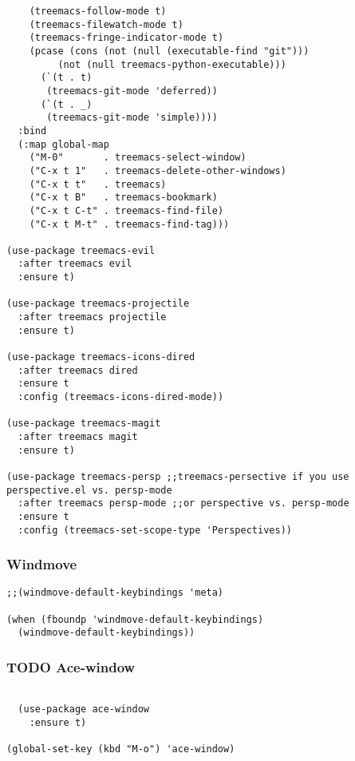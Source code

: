 \documentclass[11pt]{article}
\begin{document}
\begin{verbatim}
    (treemacs-follow-mode t)
    (treemacs-filewatch-mode t)
    (treemacs-fringe-indicator-mode t)
    (pcase (cons (not (null (executable-find "git")))
		 (not (null treemacs-python-executable)))
      (`(t . t)
       (treemacs-git-mode 'deferred))
      (`(t . _)
       (treemacs-git-mode 'simple))))
  :bind
  (:map global-map
	("M-0"       . treemacs-select-window)
	("C-x t 1"   . treemacs-delete-other-windows)
	("C-x t t"   . treemacs)
	("C-x t B"   . treemacs-bookmark)
	("C-x t C-t" . treemacs-find-file)
	("C-x t M-t" . treemacs-find-tag)))

(use-package treemacs-evil
  :after treemacs evil
  :ensure t)

(use-package treemacs-projectile
  :after treemacs projectile
  :ensure t)

(use-package treemacs-icons-dired
  :after treemacs dired
  :ensure t
  :config (treemacs-icons-dired-mode))

(use-package treemacs-magit
  :after treemacs magit
  :ensure t)

(use-package treemacs-persp ;;treemacs-persective if you use perspective.el vs. persp-mode
  :after treemacs persp-mode ;;or perspective vs. persp-mode
  :ensure t
  :config (treemacs-set-scope-type 'Perspectives))

\end{verbatim}
\subsubsection{Windmove}
\label{sec:org5c2abda}
\begin{verbatim}
;;(windmove-default-keybindings 'meta)

(when (fboundp 'windmove-default-keybindings)
  (windmove-default-keybindings))

\end{verbatim}



\subsubsection{{\bfseries\sffamily TODO} Ace-window}
\label{sec:org442b5f1}
\begin{verbatim}

  (use-package ace-window
    :ensure t)

(global-set-key (kbd "M-o") 'ace-window)


\end{verbatim}
\end{document}
